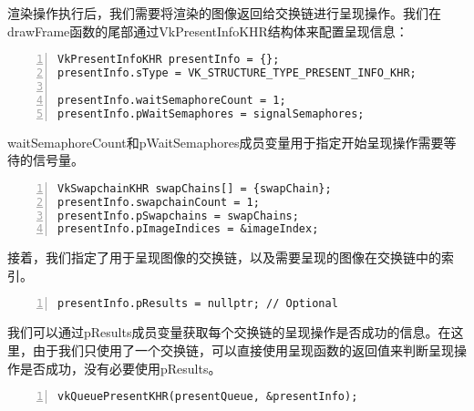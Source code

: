 \documentclass{ctexart}
\begin{document}
渲染操作执行后，我们需要将渲染的图像返回给交换链进行呈现操作。我们在drawFrame函数的尾部通过VkPresentInfoKHR结构体来配置呈现信息：

\begin{lstlisting}[language={[ANSI]C},keywordstyle=\color{blue!70},commentstyle=\color{red!50!green!50!blue!50},frame=shadowbox, rulesepcolor=\color{red!20!green!20!blue!20},basicstyle=\small,numbers=left, numberstyle=\tiny,breaklines=true]
VkPresentInfoKHR presentInfo = {};
presentInfo.sType = VK_STRUCTURE_TYPE_PRESENT_INFO_KHR;

presentInfo.waitSemaphoreCount = 1;
presentInfo.pWaitSemaphores = signalSemaphores;
\end{lstlisting}

waitSemaphoreCount和pWaitSemaphores成员变量用于指定开始呈现操作需要等待的信号量。

\begin{lstlisting}[language={[ANSI]C},keywordstyle=\color{blue!70},commentstyle=\color{red!50!green!50!blue!50},frame=shadowbox, rulesepcolor=\color{red!20!green!20!blue!20},basicstyle=\small,numbers=left, numberstyle=\tiny,breaklines=true]
VkSwapchainKHR swapChains[] = {swapChain};
presentInfo.swapchainCount = 1;
presentInfo.pSwapchains = swapChains;
presentInfo.pImageIndices = &imageIndex;
\end{lstlisting}

接着，我们指定了用于呈现图像的交换链，以及需要呈现的图像在交换链中的索引。

\begin{lstlisting}[language={[ANSI]C},keywordstyle=\color{blue!70},commentstyle=\color{red!50!green!50!blue!50},frame=shadowbox, rulesepcolor=\color{red!20!green!20!blue!20},basicstyle=\small,numbers=left, numberstyle=\tiny,breaklines=true]
presentInfo.pResults = nullptr; // Optional
\end{lstlisting}

我们可以通过pResults成员变量获取每个交换链的呈现操作是否成功的信息。在这里，由于我们只使用了一个交换链，可以直接使用呈现函数的返回值来判断呈现操作是否成功，没有必要使用pResults。

\begin{lstlisting}[language={[ANSI]C},keywordstyle=\color{blue!70},commentstyle=\color{red!50!green!50!blue!50},frame=shadowbox, rulesepcolor=\color{red!20!green!20!blue!20},basicstyle=\small,numbers=left, numberstyle=\tiny,breaklines=true]
vkQueuePresentKHR(presentQueue, &presentInfo);
\end{lstlisting}
\end{document}
